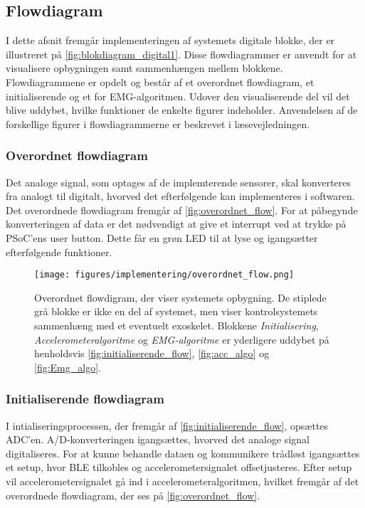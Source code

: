 \subsection{Flowdiagram} \label{sec:flow}
I dette afsnit fremgår implementeringen af systemets digitale blokke, der er illustreret på \autoref{fig:blokdiagram_digital1}. 
Disse flowdiagrammer er anvendt for at visualisere opbygningen samt sammenhængen mellem blokkene. 
Flowdiagrammene er opdelt og består af et overordnet flowdiagram, et initialiserende og et for EMG-algoritmen. 
Udover den visualiserende del vil det blive uddybet, hvilke funktioner de enkelte figurer indeholder. 
Anvendelsen af de forskellige figurer i flowdiagrammerne er beskrevet i læsevejledningen.

\subsubsection{Overordnet flowdiagram}
Det analoge signal, som optages af de implemterende sensorer, skal konverteres fra analogt til digitalt, hvorved det efterfølgende kan implementeres i softwaren. 
Det overordnede flowdiagram fremgår af \autoref{fig:overordnet_flow}. 
For at påbegynde konverteringen af data er det nødvendigt at give et interrupt ved at trykke på PSoC'ens user button. 
Dette får en grøn LED til at lyse og igangsætter efterfølgende funktioner. 

\begin{figure}[H]
\centering
\texttt{[image: figures/implementering/overordnet\_flow.png]}
\caption{Overordnet flowdigram, der viser systemets opbygning. De stiplede grå blokke er ikke en del af systemet, men viser kontrolsystemets sammenhæng med et eventuelt exoskelet. Blokkene \emph{Initialisering}, \emph{Accelerometeralgoritme} og \emph{EMG-algoritme} er yderligere uddybet på henholdsvis \autoref{fig:initialiserende_flow}, \autoref{fig:acc_algo} og \autoref{fig:Emg_algo}.}
\label{fig:overordnet_flow}
\end{figure}

\subsubsection{Initialiserende flowdiagram}
I intialiseringsprocessen, der fremgår af \autoref{fig:initialiserende_flow}, opsættes ADC'en. 
A/D-konverteringen igangsættes, hvorved det analoge signal digitaliseres. 
For at kunne behandle dataen og kommunikere trådløst igangsættes et setup, hvor BLE tilkobles og accelerometersignalet offsetjusteres. 
Efter setup vil accelerometersignalet gå ind i accelerometeralgoritmen, hvilket fremgår af det overordnede flowdiagram, der ses på \autoref{fig:overordnet_flow}.  

